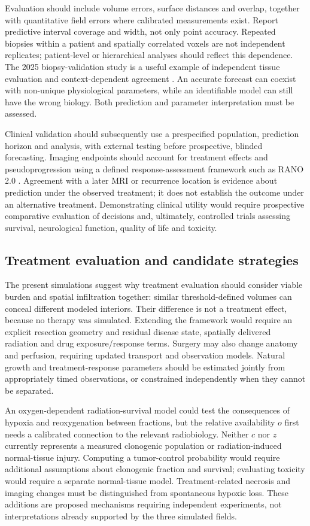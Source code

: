 Evaluation should include volume errors, surface distances and overlap, together with quantitative field errors where calibrated measurements exist. Report predictive interval coverage and width, not only point accuracy. Repeated biopsies within a patient and spatially correlated voxels are not independent replicates; patient-level or hierarchical analyses should reflect this dependence. The 2025 biopsy-validation study is a useful example of independent tissue evaluation and context-dependent agreement \citep{nocera2025}. An accurate forecast can coexist with non-unique physiological parameters, while an identifiable model can still have the wrong biology. Both prediction and parameter interpretation must be assessed.

Clinical validation should subsequently use a prespecified population, prediction horizon and analysis, with external testing before prospective, blinded forecasting. Imaging endpoints should account for treatment effects and pseudoprogression using a defined response-assessment framework such as RANO 2.0 \citep{wen2023}. Agreement with a later MRI or recurrence location is evidence about prediction under the observed treatment; it does not establish the outcome under an alternative treatment. Demonstrating clinical utility would require prospective comparative evaluation of decisions and, ultimately, controlled trials assessing survival, neurological function, quality of life and toxicity.

\subsection{Treatment evaluation and candidate strategies}
The present simulations suggest why treatment evaluation should consider viable burden and spatial infiltration together: similar threshold-defined volumes can conceal different modeled interiors. Their difference is not a treatment effect, because no therapy was simulated. Extending the framework would require an explicit resection geometry and residual disease state, spatially delivered radiation and drug exposure/response terms. Surgery may also change anatomy and perfusion, requiring updated transport and observation models. Natural growth and treatment-response parameters should be estimated jointly from appropriately timed observations, or constrained independently when they cannot be separated.

An oxygen-dependent radiation-survival model could test the consequences of hypoxia and reoxygenation between fractions, but the relative availability $o$ first needs a calibrated connection to the relevant radiobiology. Neither $c$ nor $z$ currently represents a measured clonogenic population or radiation-induced normal-tissue injury. Computing a tumor-control probability would require additional assumptions about clonogenic fraction and survival; evaluating toxicity would require a separate normal-tissue model. Treatment-related necrosis and imaging changes must be distinguished from spontaneous hypoxic loss. These additions are proposed mechanisms requiring independent experiments, not interpretations already supported by the three simulated fields.

